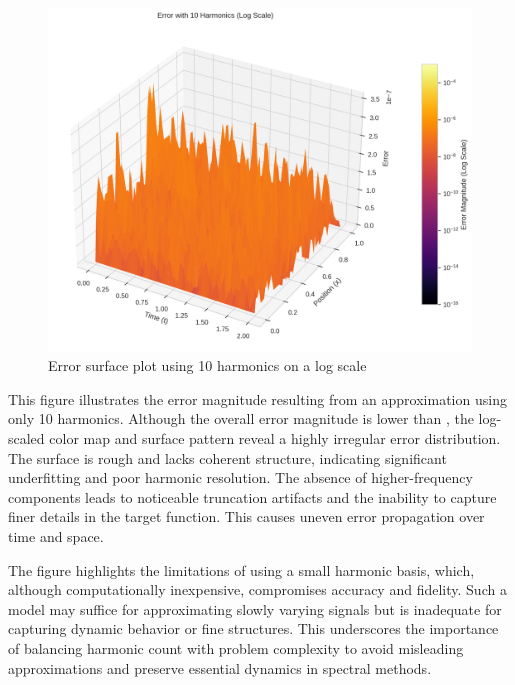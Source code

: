 \documentclass[preprint,12pt]{elsarticle}
\begin{document}
\begin{figure}[t]
    \centering
    \includegraphics[width=0.9\linewidth]{figures/3d_comparison_error_10h.png}
    \caption{Error surface plot using 10 harmonics on a log scale}
    \label{fig:error_10h}
\end{figure}

This figure illustrates the error magnitude resulting from an approximation using only 10 harmonics. Although the overall error magnitude is lower than , the log-scaled color map and surface pattern reveal a highly irregular error distribution. The surface is rough and lacks coherent structure, indicating significant underfitting and poor harmonic resolution. The absence of higher-frequency components leads to noticeable truncation artifacts and the inability to capture finer details in the target function. This causes uneven error propagation over time and space. 

The figure highlights the limitations of using a small harmonic basis, which, although computationally inexpensive, compromises accuracy and fidelity. Such a model may suffice for approximating slowly varying signals but is inadequate for capturing dynamic behavior or fine structures. This underscores the importance of balancing harmonic count with problem complexity to avoid misleading approximations and preserve essential dynamics in spectral methods.
\end{document}
